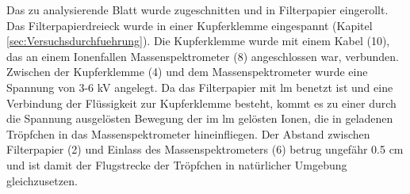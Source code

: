 Das zu analysierende Blatt wurde zugeschnitten und in Filterpapier eingerollt. Das Filterpapierdreieck wurde in einer Kupferklemme eingespannt (Kapitel \ref{sec:Versuchsdurchfuehrung}). Die Kupferklemme wurde mit einem Kabel (10), das an einem Ionenfallen Massenspektrometer (8) angeschlossen war, verbunden. Zwischen der Kupferklemme (4) und dem Massenspektrometer wurde eine Spannung von 3-6 kV angelegt. Da das Filterpapier mit \gls{lm} benetzt ist und eine Verbindung der Flüssigkeit zur Kupferklemme besteht, kommt es zu einer durch die Spannung ausgelösten Bewegung der im \gls{lm} gelösten Ionen, die in geladenen Tröpfchen in das Massenspektrometer hineinfliegen. Der Abstand zwischen Filterpapier (2) und Einlass des Massenspektrometers (6) betrug ungefähr 0.5 cm und ist damit der Flugstrecke der Tröpfchen in natürlicher Umgebung gleichzusetzen. 


